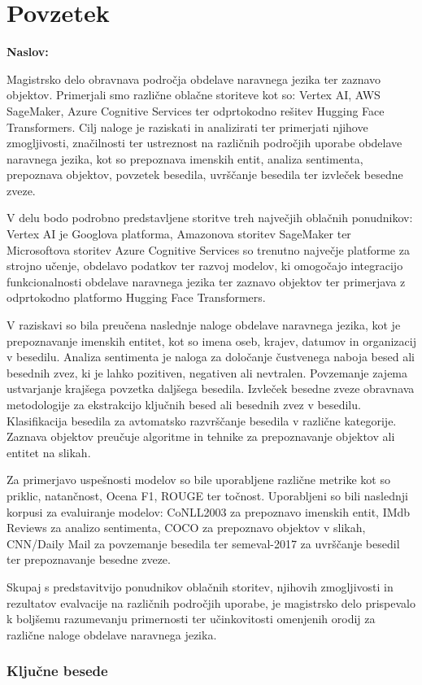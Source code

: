 \chapter*{Povzetek}

\noindent\textbf{Naslov:} \ttitle
\bigskip

Magistrsko delo obravnava področja obdelave naravnega jezika ter zaznavo objektov. Primerjali smo različne oblačne storiteve kot so: Vertex AI, AWS SageMaker, Azure Cognitive Services ter odprtokodno rešitev Hugging Face Transformers. Cilj naloge je raziskati in analizirati ter primerjati njihove zmogljivosti, značilnosti ter ustreznost na različnih področjih uporabe obdelave naravnega jezika, kot so prepoznava imenskih entit, analiza sentimenta, prepoznava objektov, povzetek  besedila, uvrščanje besedila ter izvleček besedne zveze.

V delu bodo podrobno predstavljene storitve treh največjih oblačnih ponudnikov: Vertex AI je Googlova platforma, Amazonova storitev SageMaker ter Microsoftova storitev Azure Cognitive Services so trenutno največje platforme za strojno učenje, obdelavo podatkov ter razvoj modelov, ki omogočajo integracijo funkcionalnosti obdelave naravnega jezika ter zaznavo objektov ter primerjava z odprtokodno platformo Hugging Face Transformers.

V raziskavi so bila preučena naslednje naloge obdelave naravnega jezika, kot je prepoznavanje imenskih entitet, kot so imena oseb, krajev, datumov in organizacij v besedilu.
Analiza sentimenta je naloga za določanje čustvenega naboja besed ali besednih zvez, ki je lahko pozitiven, negativen ali nevtralen. Povzemanje zajema ustvarjanje krajšega povzetka daljšega besedila. Izvleček besedne zveze obravnava metodologije za ekstrakcijo ključnih besed ali besednih zvez v besedilu. 
Klasifikacija besedila za avtomatsko razvrščanje besedila v različne kategorije. Zaznava objektov preučuje algoritme in tehnike za prepoznavanje objektov ali entitet na slikah.

Za primerjavo uspešnosti modelov so bile uporabljene različne metrike kot so priklic, natančnost, Ocena F1, ROUGE ter točnost. Uporabljeni so bili naslednji korpusi za  evaluiranje modelov: CoNLL2003 za prepoznavo imenskih entit, IMdb Reviews za analizo sentimenta, COCO za prepoznavo objektov v slikah, CNN/Daily Mail za povzemanje besedila ter semeval-2017 za uvrščanje besedil ter prepoznavanje besedne zveze.

Skupaj s predstavitvijo ponudnikov oblačnih storitev, njihovih zmogljivosti in rezultatov evalvacije na različnih področjih uporabe, je magistrsko delo prispevalo k boljšemu razumevanju primernosti ter učinkovitosti omenjenih orodij za različne naloge obdelave naravnega jezika.

\subsection*{Ključne besede}
\textit{\tkeywords}
\clearemptydoublepage 